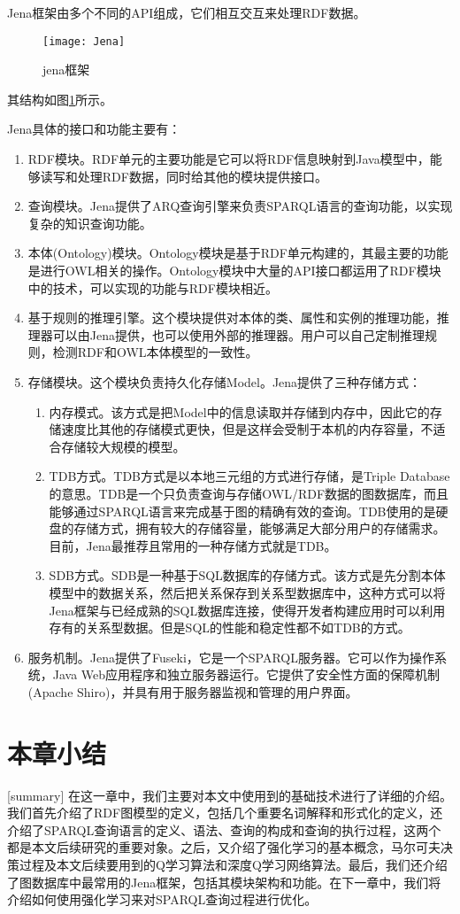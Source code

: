 Jena框架由多个不同的API组成，它们相互交互来处理RDF数据。
\begin{figure}[h]
    \centering
    \texttt{[image: Jena]}
    \caption{jena框架}
    \label{Jena}
\end{figure}
其结构如图\ref{Jena}所示。

Jena具体的接口和功能主要有：
\begin{enumerate}
    \item RDF模块。RDF单元的主要功能是它可以将RDF信息映射到Java模型中，能够读写和处理RDF数据，同时给其他的模块提供接口。
    \item 查询模块。Jena提供了ARQ查询引擎来负责SPARQL语言的查询功能，以实现复杂的知识查询功能。
    \item 本体(Ontology)模块。Ontology模块是基于RDF单元构建的，其最主要的功能是进行OWL相关的操作。Ontology模块中大量的API接口都运用了RDF模块中的技术，可以实现的功能与RDF模块相近。
    \item 基于规则的推理引擎。这个模块提供对本体的类、属性和实例的推理功能，推理器可以由Jena提供，也可以使用外部的推理器。用户可以自己定制推理规则，检测RDF和OWL本体模型的一致性。
    \item 存储模块。这个模块负责持久化存储Model。Jena提供了三种存储方式：
    \begin{enumerate}
        \item 内存模式。该方式是把Model中的信息读取并存储到内存中，因此它的存储速度比其他的存储模式更快，但是这样会受制于本机的内存容量，不适合存储较大规模的模型。
        \item TDB方式。TDB方式是以本地三元组的方式进行存储，是Triple Database的意思。TDB是一个只负责查询与存储OWL/RDF数据的图数据库，而且能够通过SPARQL语言来完成基于图的精确有效的查询。TDB使用的是硬盘的存储方式，拥有较大的存储容量，能够满足大部分用户的存储需求。目前，Jena最推荐且常用的一种存储方式就是TDB。
        \item SDB方式。SDB是一种基于SQL数据库的存储方式。该方式是先分割本体模型中的数据关系，然后把关系保存到关系型数据库中，这种方式可以将Jena框架与已经成熟的SQL数据库连接，使得开发者构建应用时可以利用存有的关系型数据。但是SQL的性能和稳定性都不如TDB的方式。
    \end{enumerate}
    \item 服务机制。Jena提供了Fuseki，它是一个SPARQL服务器。它可以作为操作系统，Java Web应用程序和独立服务器运行。它提供了安全性方面的保障机制(Apache Shiro)，并具有用于服务器监视和管理的用户界面。
\end{enumerate}

\section{本章小结}[summary]
在这一章中，我们主要对本文中使用到的基础技术进行了详细的介绍。我们首先介绍了RDF图模型的定义，包括几个重要名词解释和形式化的定义，还介绍了SPARQL查询语言的定义、语法、查询的构成和查询的执行过程，这两个都是本文后续研究的重要对象。之后，又介绍了强化学习的基本概念，马尔可夫决策过程及本文后续要用到的Q学习算法和深度Q学习网络算法。最后，我们还介绍了图数据库中最常用的Jena框架，包括其模块架构和功能。在下一章中，我们将介绍如何使用强化学习来对SPARQL查询过程进行优化。

